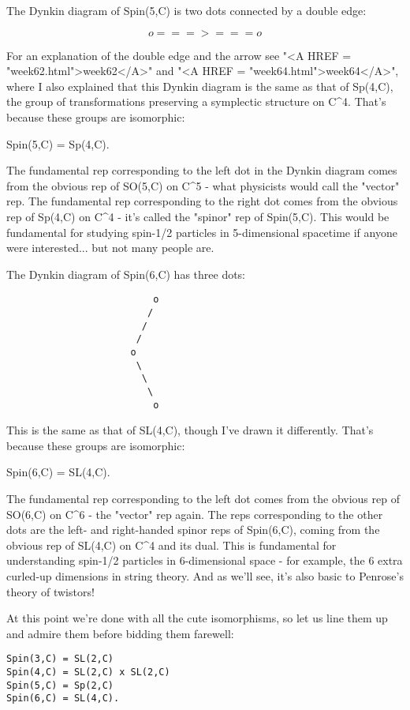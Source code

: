 The Dynkin diagram of Spin(5,C) is two dots connected by a
double edge:


$$
                      o===>===o 
$$
    
For an explanation of the double edge and the arrow 
see "<A HREF = "week62.html">week62</A>"
and "<A HREF = "week64.html">week64</A>", 
where I also explained that this Dynkin diagram is the
same as that of Sp(4,C), the group of transformations preserving
a symplectic structure on C^4.  That's because these groups are isomorphic:

Spin(5,C) = Sp(4,C).

The fundamental rep corresponding to the left dot in the Dynkin diagram
comes from the obvious rep of SO(5,C) on C^{5} - what physicists would
call the "vector" rep.  The fundamental rep corresponding to the right
dot comes from the obvious rep of Sp(4,C) on C^{4} - it's called the
"spinor" rep of Spin(5,C).  This would be fundamental for
studying spin-1/2 particles in 5-dimensional spacetime if anyone were
interested... but not many people are.  

The Dynkin diagram of Spin(6,C) has three dots:
\begin{verbatim}
                          o
                         /
                        /
                       /
                      o
                       \
                        \
                         \
                          o
\end{verbatim}
    
This is the same as that of SL(4,C), though I've drawn it differently.
That's because these groups are isomorphic:

Spin(6,C) = SL(4,C).

The fundamental rep corresponding to the left dot comes from the 
obvious rep of SO(6,C) on C^{6} - the "vector" rep again.  
The reps corresponding to the other dots are the left- and right-handed
spinor reps of Spin(6,C), coming from the obvious rep of SL(4,C)
on C^{4} and its dual.  This is fundamental for understanding
spin-1/2 particles in 6-dimensional space - for example, the 6 extra
curled-up dimensions in string theory.  And as we'll see, it's also
basic to Penrose's theory of twistors!


At this point we're done with all the cute isomorphisms, so let us line
them up and admire them before bidding them farewell:

\begin{verbatim}
Spin(3,C) = SL(2,C)
Spin(4,C) = SL(2,C) x SL(2,C)
Spin(5,C) = Sp(2,C)
Spin(6,C) = SL(4,C).
\end{verbatim}
    
